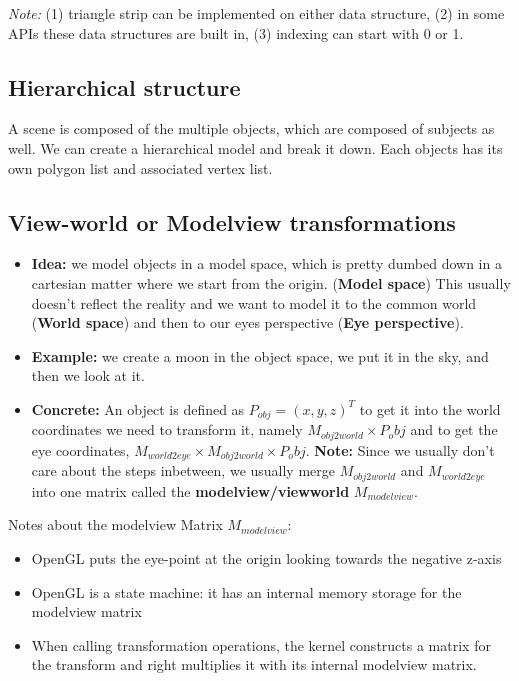 \documentclass[11pt]{article}
\begin{document}
\textit{Note:} (1) triangle strip can be implemented on either data structure, (2) in some APIs these data structures are built in, (3) indexing can start with 0 or 1.

\subsection{Hierarchical structure}
A scene is composed of the multiple objects, which are composed of subjects as well. We can create a hierarchical model and break it down. Each objects has its own polygon list and associated vertex list.
\subsection{View-world or Modelview transformations}
\begin{itemize}
    \item \textbf{Idea:}  we model objects in a model space, which is pretty dumbed down in a cartesian matter where we start from the origin. (\textbf{Model space}) This usually doesn't reflect the reality and we want to model it to the common world (\textbf{World space}) and then to our eyes perspective (\textbf{Eye perspective}). 
    \item \textbf{Example:}  we create a moon in the object space, we put it in the sky, and then we look at it. 
    \item \textbf{Concrete:} An object is defined as $P_{obj} = (x,y,z)^T$ to get it into the world coordinates we need to transform it, namely $M_{obj2world} \times P_obj$ and to get the eye coordinates, $M_{world2eye}\times M_{obj2world} \times P_obj$.
    \textbf{Note:} Since we usually don't care about the steps inbetween, we usually merge $M_{obj2world}$ and $M_{world2eye}$ into one matrix called the \textbf{modelview/viewworld} $M_{modelview}$.
\end{itemize}


Notes about the modelview Matrix $M_{modelview}$:
\begin{itemize}
    \item OpenGL puts the eye-point at the origin looking towards the negative z-axis
    \item OpenGL is a state machine: it has an internal memory storage for the modelview matrix
    \item When calling transformation operations, the kernel constructs a matrix for the transform and right multiplies it with its internal modelview matrix.
\end{itemize} %
\end{document}
